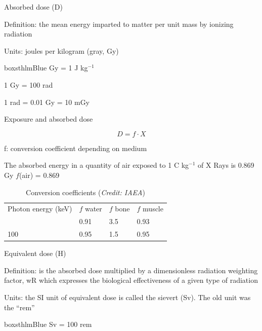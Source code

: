 \begin{frame}{Absorbed dose (D)}

\alert{Definition}: the mean energy imparted to matter per unit mass by ionizing radiation

\alert{Units}:  joules per kilogram  (gray, Gy)

\vskip1cm

\begin{beamercolorbox}[wd=\linewidth,ht=12ex,dp=3ex]{boxsthlmBlue} Gy = 1 J kg$^{-1}$

1 Gy = 100 rad

1 rad = 0.01 Gy = 10 mGy\end{beamercolorbox}






\end{frame}


\begin{frame}{Exposure and absorbed dose}


\[D = f \cdot X\]



f: conversion coefficient depending on medium


\alert{The absorbed energy in a quantity of air exposed to 1 C kg$^{-1}$ of X Rays is 0.869 Gy
$f$(air) = 0.869}

\begin{table}[H]
\caption*{Conversion coefficients (\emph{Credit: IAEA})}
\vskip 0.2cm
\begin{center}
  \begin{tabular}{llll}
  \toprule
  Photon energy (keV) & $f$ water & $f$ bone  & $f$ muscle \\ \otoprule
10 & 0.91 & 3.5 & 0.93 \\
100 & 0.95 & 1.5 & 0.95  \\ \bottomrule
\end{tabular}
\end{center}
\end{table}

\end{frame}

\begin{frame}{Equivalent dose (H)}

\alert{Definition}: is the absorbed dose multiplied by a dimensionless radiation weighting factor, wR which expresses the biological effectiveness of a given type of radiation

\alert{Units}: the SI unit of equivalent dose is called the sievert (Sv). The old unit was the ``rem''

\vskip1cm

\begin{beamercolorbox}[wd=\linewidth,ht=3ex,dp=3ex]{boxsthlmBlue} Sv = 100 rem\end{beamercolorbox}




\end{frame}


